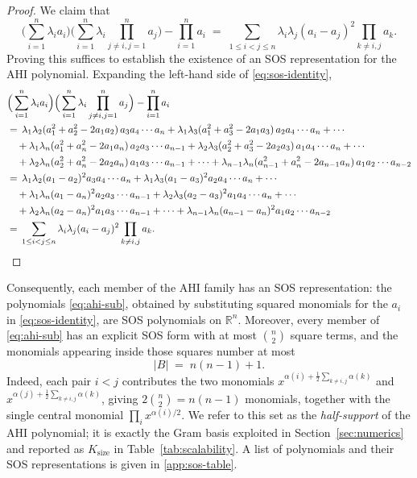 \documentclass[12pt]{elsarticle}
\theoremstyle{definition}
\begin{document}
\begin{proof}
We claim that
\begin{equation}\label{eq:sos-identity}
\Big(\sum_{i=1}^n \lambda_i a_i\Big) \Big(\sum_{i=1}^n \lambda_i \prod_{{j\neq i}, j=1}^n a_j\Big) - \prod_{i=1}^n a_i \;=\; \sum_{1\leq i<j\leq n} \lambda_i\lambda_j (a_i - a_j)^2\prod_{k\neq i,j}a_k .
\end{equation}
Proving this suffices to establish the existence of an SOS representation for the AHI polynomial. Expanding the left-hand side of \eqref{eq:sos-identity},
\[
\begin{aligned}
&\Big(\sum_{i=1}^n \lambda_i a_i\Big) \Big(\sum_{i=1}^n \lambda_i \prod_{{j\neq i}, j=1}^n a_j\Big) - \prod_{i=1}^n a_i\\
&=\, \lambda_1\lambda_2(a_{1}^2 + a_{2}^2 - 2a_{1}a_{2})\,a_{3}a_{4}\cdots a_{n}
 + \lambda_1\lambda_3(a_{1}^2 + a_{3}^2 - 2a_{1}a_{3})\,a_{2}a_{4}\cdots a_{n} + \cdots \\
&\quad + \lambda_1\lambda_n(a_{1}^2 + a_{n}^2 - 2a_{1}a_{n})\,a_{2}a_{3}\cdots a_{n-1}
 + \lambda_2\lambda_3(a_{2}^2 + a_{3}^2 - 2a_{2}a_{3})\,a_{1}a_{4}\cdots a_{n} + \cdots \\
&\quad + \lambda_2\lambda_n(a_{2}^2 + a_{n}^2 - 2a_{2}a_{n})\,a_{1}a_{3}\cdots a_{n-1} + \cdots
 + \lambda_{n-1}\lambda_n(a_{n-1}^2 + a_{n}^2 - 2a_{n-1}a_{n})\,a_{1}a_{2}\cdots a_{n-2}\\
&=\, \lambda_1\lambda_2 (a_{1}-a_{2})^{2} a_{3}a_{4}\cdots a_{n}
 + \lambda_1\lambda_3(a_{1}-a_{3})^{2} a_{2}a_{4}\cdots a_{n} + \cdots \\
&\quad + \lambda_1\lambda_n(a_{1}-a_{n})^{2} a_{2}a_{3}\cdots a_{n-1}
 + \lambda_2\lambda_3(a_{2}-a_{3})^{2} a_{1}a_{4}\cdots a_{n} + \cdots \\
&\quad + \lambda_2\lambda_n(a_{2}-a_{n})^{2} a_{1}a_{3}\cdots a_{n-1} + \cdots
 + \lambda_{n-1}\lambda_n(a_{n-1}-a_{n})^{2} a_{1}a_{2}\cdots a_{n-2}\\
&=\,\sum_{1\leq i<j\leq n}\lambda_i\lambda_j(a_i - a_j)^2\prod_{k\neq i,j}a_k. \qedhere
 \end{aligned}
\]
\end{proof}

Consequently, each member of the AHI family has an SOS representation: the polynomials \eqref{eq:ahi-sub}, obtained by substituting squared monomials for the $a_i$ in \eqref{eq:sos-identity}, are SOS polynomials on $\mathbb{R}^{n}$. Moreover, every member of \eqref{eq:ahi-sub} has an explicit SOS form with at most $\binom{n}{2}$ square terms, and the monomials appearing inside those squares number at most
\begin{equation}\label{eq:half-support}
|B| \;=\; n(n-1)+1 .
\end{equation}
Indeed, each pair $i<j$ contributes the two monomials $x^{\alpha(i)+\frac12\sum_{k\ne i,j}\alpha(k)}$ and $x^{\alpha(j)+\frac12\sum_{k\ne i,j}\alpha(k)}$, giving $2\binom{n}{2}=n(n-1)$ monomials, together with the single central monomial $\prod_{i}x^{\alpha(i)/2}$. We refer to this set as the \emph{half-support} of the AHI polynomial; it is exactly the Gram basis exploited in Section~\ref{sec:numerics} and reported as $K_{\mathrm{size}}$ in Table~\ref{tab:scalability}. A list of polynomials and their SOS representations is given in \ref{app:sos-table}.
\end{document}

